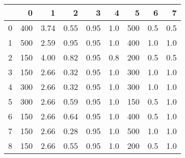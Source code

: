 \begin{tabular}{lrrrrrrrr}
\toprule
{} &    0 &     1 &     2 &     3 &    4 &    5 &    6 &    7 \\
\midrule
0 &  400 &  3.74 &  0.55 &  0.95 &  1.0 &  500 &  0.5 &  0.5 \\
1 &  500 &  2.59 &  0.95 &  0.95 &  1.0 &  400 &  1.0 &  1.0 \\
2 &  150 &  4.00 &  0.82 &  0.95 &  0.8 &  200 &  0.5 &  0.5 \\
3 &  150 &  2.66 &  0.32 &  0.95 &  1.0 &  300 &  1.0 &  1.0 \\
4 &  300 &  2.66 &  0.32 &  0.95 &  1.0 &  300 &  1.0 &  1.0 \\
5 &  300 &  2.66 &  0.59 &  0.95 &  1.0 &  150 &  0.5 &  1.0 \\
6 &  150 &  2.66 &  0.64 &  0.95 &  1.0 &  400 &  0.5 &  1.0 \\
7 &  150 &  2.66 &  0.28 &  0.95 &  1.0 &  500 &  1.0 &  1.0 \\
8 &  150 &  2.66 &  0.55 &  0.95 &  1.0 &  200 &  0.5 &  1.0 \\
\bottomrule
\end{tabular}

